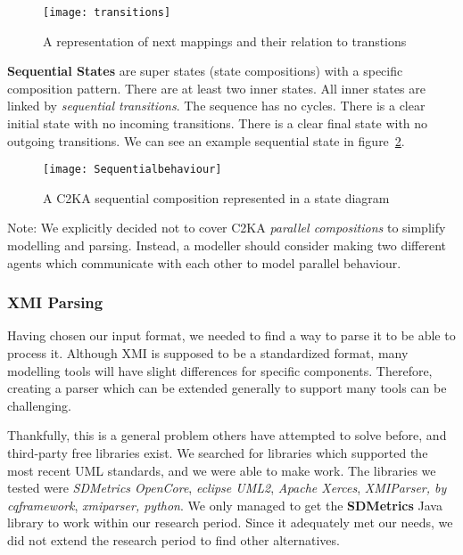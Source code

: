 \begin{figure}[h]
    \centering
    \texttt{[image: transitions]}
    \caption{A representation of next mappings and their relation to transtions}
    \label{fig:transition}
\end{figure}

\textbf{Sequential States} are super states (state compositions) with a specific composition pattern.
There are at least two inner states.
All inner states are linked by \textit{sequential transitions}.
The sequence has no cycles.
There is a clear initial state with no incoming transitions.
There is a clear final state with no outgoing transitions.
We can see an example sequential state in figure~\ref{fig:sequential}.

\begin{figure}[h]
    \centering
    \texttt{[image: Sequentialbehaviour]}
    \caption{A C2KA sequential composition represented in a state diagram}
    \label{fig:sequential}
\end{figure}

Note: We explicitly decided not to cover C2KA \textit{parallel compositions} to simplify modelling and parsing.
Instead, a modeller should consider making two different agents which communicate
with each other to model parallel behaviour.

\subsubsection{XMI Parsing}\label{subsubsec:parsing}
Having chosen our input format, we needed to find a way to parse it to be able to process it.
Although XMI is supposed to be a standardized format,
many modelling tools will have slight differences for specific components.
Therefore, creating a parser which can be extended generally to support many tools can be challenging.

Thankfully, this is a general problem others have attempted to solve before, and third-party free libraries exist.
We searched for libraries which supported the most recent UML standards, and we were able to make work.
The libraries we tested were \textit{SDMetrics OpenCore},
\textit{eclipse UML2}, \textit{Apache Xerces}, \textit{XMIParser, by cqframework}, \textit{xmiparser, python}.
We only managed to get the \textbf{SDMetrics} Java library to work within our research period.
Since it adequately met our needs, we did not extend the research period to find other alternatives.

